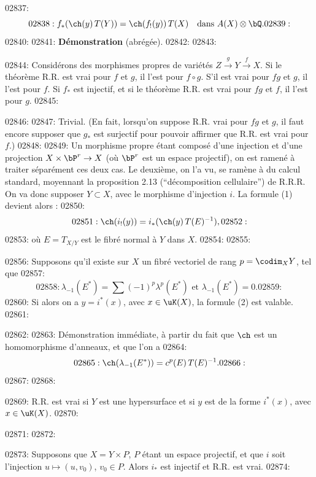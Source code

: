 02837: \begin{equation}\label{eq:rr.1}
02838: f_*(\ch(y)\,T(Y)) = \ch(f_!(y))\,T(X) \quad \text{dans } A(X) \otimes \bQ.
02839: \end{equation}
02840: 
02841: \textbf{D\'emonstration} (abr\'eg\'ee).
02842: 
02843: \begin{lemme}
02844: Consid\'erons des morphismes propres de vari\'et\'es $Z \xrightarrow{g} Y \xrightarrow{f} X$. Si le th\'eor\`eme R.R. est vrai pour $f$ et $g$, il l'est pour $f \circ g$. S'il est vrai pour $fg$ et $g$, il l'est pour $f$. Si $f_*$ est injectif, et si le th\'eor\`eme R.R. est vrai pour $fg$ et $f$, il l'est pour $g$.
02845: \end{lemme}
02846: 
02847: Trivial. (En fait, lorsqu'on suppose R.R. vrai pour $fg$ et $g$, il faut encore supposer que $g_*$ est surjectif pour pouvoir affirmer que R.R. est vrai pour $f$.)
02848: 
02849: Un morphisme propre \'etant compos\'e d'une injection et d'une projection $X \times \bP^r \to X$ (o\`u $\bP^r$ est un espace projectif), on est ramen\'e \`a traiter s\'epar\'ement ces deux cas. Le deuxi\`eme, on l'a vu, se ram\`ene \`a du calcul standard, moyennant la proposition 2.13 (``d\'ecomposition cellulaire'') de R.R.R. On va donc supposer $Y \subset X$, avec le morphisme d'injection $i$. La formule (1) devient alors :
02850: \begin{equation}\label{eq:rr.2}
02851: \ch(i_!(y)) = i_*(\ch(y)\,T(E)^{-1}),
02852: \end{equation}
02853: o\`u $E = T_{X/Y}$ est le fibr\'e normal \`a $Y$ dans $X$.
02854: 
02855: \begin{lemme}
02856: Supposons qu'il existe sur $X$ un fibr\'e vectoriel de rang $p = \codim_X Y$, tel que
02857: \[
02858: \lambda_{-1}(E^*) = \sum (-1)^p \lambda^p(E^*) \text{ et } \lambda_{-1}(E^*) = 0.
02859: \]
02860: Si alors on a $y = i^*(x)$, avec $x \in \uK(X)$, la formule (2) est valable.
02861: \end{lemme}
02862: 
02863: D\'emonstration imm\'ediate, \`a partir du fait que $\ch$ est un homomorphisme d'anneaux, et que l'on a
02864: \begin{equation}\label{eq:rr.5}
02865: \ch(\lambda_{-1}(E^*)) = c^p(E)\,T(E)^{-1}.
02866: \end{equation}
02867: 
02868: \begin{corollaire}
02869: R.R. est vrai si $Y$ est une hypersurface et si $y$ est de la forme $i^*(x)$, avec $x \in \uK(X)$.
02870: \end{corollaire}
02871: 
02872: \begin{lemme}
02873: Supposons que $X = Y \times P$, $P$ \'etant un espace projectif, et que $i$ soit l'injection $u \mapsto (u, v_0)$, $v_0 \in P$. Alors $i_*$ est injectif et R.R. est vrai.
02874: \end{lemme}
